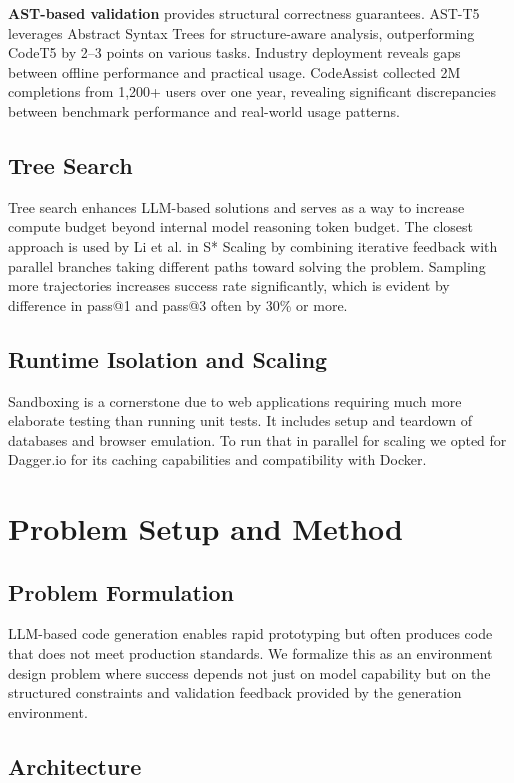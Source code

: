 \documentclass{article}
\begin{document}
\textbf{AST-based validation} provides structural correctness guarantees. AST-T5 leverages Abstract Syntax Trees for structure-aware analysis, outperforming CodeT5 by 2--3 points on various tasks. Industry deployment reveals gaps between offline performance and practical usage. CodeAssist collected 2M completions from 1,200+ users over one year, revealing significant discrepancies between benchmark performance and real-world usage patterns.

\subsection{Tree Search}

Tree search enhances LLM-based solutions and serves as a way to increase compute budget beyond internal model reasoning token budget. The closest approach is used by Li et al. in S* Scaling \citep{li2025s} by combining iterative feedback with parallel branches taking different paths toward solving the problem. Sampling more trajectories increases success rate significantly, which is evident by difference in pass@1 and pass@3 often by 30\% or more.

\subsection{Runtime Isolation and Scaling}
Sandboxing is a cornerstone due to web applications requiring much more elaborate testing than running unit tests. It includes setup and teardown of databases and browser emulation. To run that in parallel for scaling we opted for Dagger.io for its caching capabilities and compatibility with Docker.

\section{Problem Setup and Method}
\label{sec:method}

\subsection{Problem Formulation}

LLM-based code generation enables rapid prototyping but often produces code that does not meet production standards. We formalize this as an environment design problem where success depends not just on model capability but on the structured constraints and validation feedback provided by the generation environment.

\subsection{Architecture}
\end{document}
